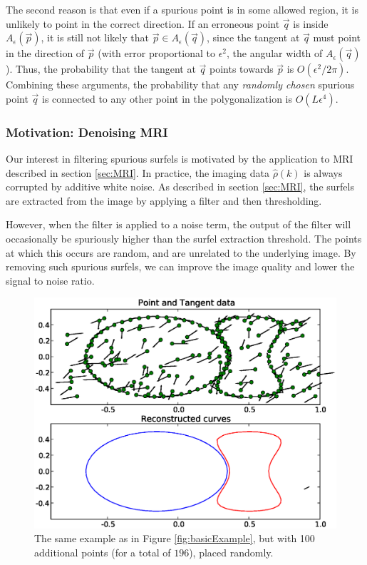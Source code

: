 \documentclass{article}
\numberwithin{cntr}{section}
\numberwithin{equation}{section}
\newcommand{\vp}[0]{{\vec{p}}}
\newcommand{\vq}[0]{{\vec{q}}}
\newcommand{\allowed}[2]{ { A_{#1}(#2) } }
\begin{document}
The second reason is that even if a spurious point is in some allowed region,
it is unlikely to point in the correct direction.
If an erroneous point $\vq$ is inside $\allowed{\epsilon}{\vp}$, it is
still not likely that $\vp \in \allowed{\epsilon}{\vq}$, since
the tangent at $\vq$ must point in the direction of $\vp$
(with error proportional to $\epsilon^{2}$, the angular width of
$\allowed{\epsilon}{\vq}$). Thus, the probability that the tangent at
$\vq$ points towards $\vp$ is $O(\epsilon^{2}/2\pi)$.
Combining these arguments, the probability that any \emph{randomly chosen}
spurious point $\vq$ is connected to any other point in the
polygonalization is $O(L \epsilon^{4})$.

\subsubsection{Motivation: Denoising MRI}

Our interest in filtering spurious surfels is motivated by the application to MRI described in section \ref{sec:MRI}. In practice, the imaging data $\hat{\rho}(k)$ is always corrupted by additive white noise. As described in section \ref{sec:MRI}, the surfels are extracted from the image by applying a filter and then thresholding.

However, when the filter is applied to a noise term, the output of the filter will occasionally be spuriously higher than the surfel extraction threshold. The points at which this occurs are random, and are unrelated to the underlying image. By removing such spurious surfels, we can improve the image quality and lower the signal to noise ratio.

\begin{figure}
\setlength{\unitlength}{0.240900pt}
\ifx\plotpoint\undefined\newsavebox{\plotpoint}\fi
\sbox{\plotpoint}{\rule[-0.200pt]{0.400pt}{0.400pt}}%
\includegraphics[scale=0.5]{noisy_example.eps}
\caption{The same example as in Figure \ref{fig:basicExample}, but with
100 additional points (for a total of $196$), placed randomly. }
\label{fig:noisyExample}
\end{figure}
\end{document}
